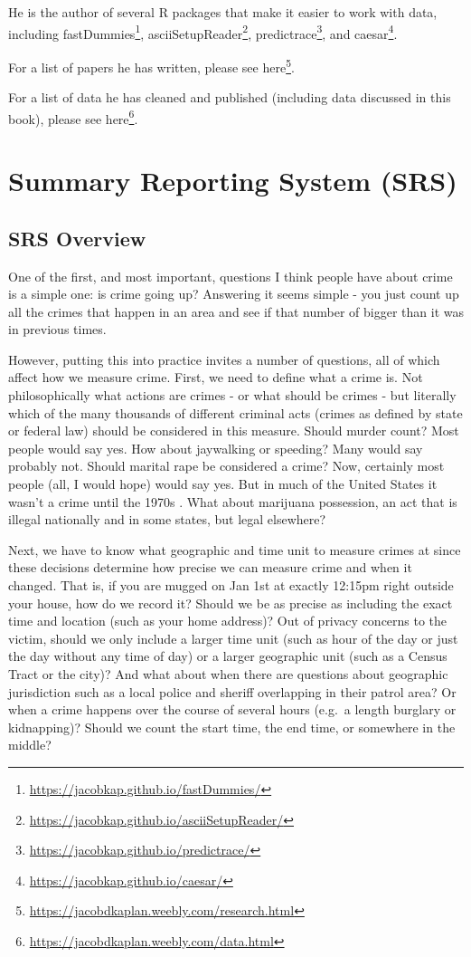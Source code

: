 \documentclass[
]{krantz}
\renewcommand{\href}[2]{#2\footnote{\url{#1}}}
\begin{document}
He is the author of several R packages that make it easier
to work with data, including
\href{https://jacobkap.github.io/fastDummies/}{fastDummies},
\href{https://jacobkap.github.io/asciiSetupReader/}{asciiSetupReader},
\href{https://jacobkap.github.io/predictrace/}{predictrace},
and \href{https://jacobkap.github.io/caesar/}{caesar}.

For a list of papers he has written, please see
\href{https://jacobdkaplan.weebly.com/research.html}{here}.

For a list of data he has cleaned and published (including
data discussed in this book), please see
\href{https://jacobdkaplan.weebly.com/data.html}{here}.

\mainmatter

\part{Summary Reporting System
(SRS)}\label{part-summary-reporting-system-srs}

\chapter{SRS Overview}\label{SRSGeneral}

One of the first, and most important, questions I think
people have about crime is a simple one: is crime going up?
Answering it seems simple - you just count up all the crimes
that happen in an area and see if that number of bigger than
it was in previous times.

However, putting this into practice invites a number of
questions, all of which affect how we measure crime. First,
we need to define what a crime is. Not philosophically what
actions are crimes - or what should be crimes - but
literally which of the many thousands of different criminal
acts (crimes as defined by state or federal law) should be
considered in this measure. Should murder count? Most people
would say yes. How about jaywalking or speeding? Many would
say probably not. Should marital rape be considered a crime?
Now, certainly most people (all, I would hope) would say
yes. But in much of the United States it wasn't a crime
until the 1970s
\citep{bennice2003marital, mcmahon2009criminalizing}. What
about marijuana possession, an act that is illegal
nationally and in some states, but legal elsewhere?

Next, we have to know what geographic and time unit to
measure crimes at since these decisions determine how
precise we can measure crime and when it changed. That is,
if you are mugged on Jan 1st at exactly 12:15pm right
outside your house, how do we record it? Should we be as
precise as including the exact time and location (such as
your home address)? Out of privacy concerns to the victim,
should we only include a larger time unit (such as hour of
the day or just the day without any time of day) or a larger
geographic unit (such as a Census Tract or the city)? And
what about when there are questions about geographic
jurisdiction such as a local police and sheriff overlapping
in their patrol area? Or when a crime happens over the
course of several hours (e.g.~a length burglary or
kidnapping)? Should we count the start time, the end time,
or somewhere in the middle?
\end{document}
